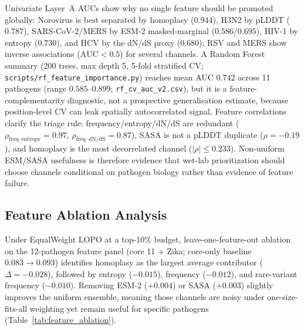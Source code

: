 Univariate Layer~A AUCs show why no single feature should be promoted globally: Norovirus is best separated by homoplasy ($0.944$), H3N2 by pLDDT ($0.787$), SARS-CoV-2/MERS by ESM-2 masked-marginal ($0.586$/$0.695$), HIV-1 by entropy ($0.730$), and HCV by the dN/dS proxy ($0.680$); RSV and MERS show inverse associations ($\mathrm{AUC}<0.5$) for several channels. A Random Forest summary (200 trees, max depth 5, 5-fold stratified CV; \texttt{scripts/rf\_feature\_importance.py}) reaches mean AUC $0.742$ across 11 pathogens (range $0.585$--$0.899$; \texttt{rf\_cv\_auc\_v2.csv})\label{tab:rf_cv_auc}, but it is a feature-complementarity diagnostic, not a prospective generalisation estimate, because position-level CV can leak spatially autocorrelated signal. Feature correlations clarify the triage rule: frequency/entropy/dN/dS are redundant ($\rho_{\text{freq--entropy}}=0.97$, $\rho_{\text{freq--dN/dS}}=0.87$), SASA is not a pLDDT duplicate ($\rho=-0.19$), and homoplasy is the most decorrelated channel ($|\rho|\leq0.233$). Non-uniform ESM/SASA usefulness is therefore evidence that wet-lab prioritization should choose channels conditional on pathogen biology rather than evidence of feature failure.

\subsection{Feature Ablation Analysis}
\label{subsec:feature_ablation}

Under EqualWeight LOPO at a top-10\% budget, leave-one-feature-out ablation on the 12-pathogen feature panel (core 11 + Zika; core-only baseline $0.083\to0.093$) identifies homoplasy as the largest average contributor ($\Delta=-0.028$), followed by entropy ($-0.015$), frequency ($-0.012$), and rare-variant frequency ($-0.010$). Removing ESM-2 ($+0.004$) or SASA ($+0.003$) slightly improves the uniform ensemble, meaning those channels are noisy under one-size-fits-all weighting yet remain useful for specific pathogens (Table~\ref{tab:feature_ablation}\label{fig:feature_ablation}).

